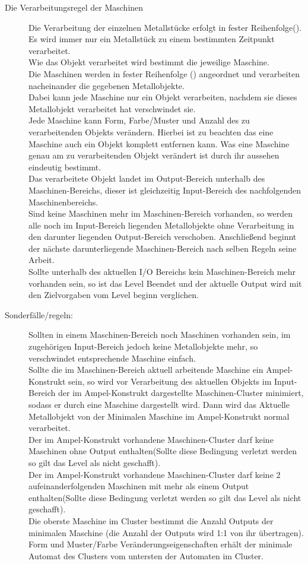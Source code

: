 \documentclass{scrartcl}
\begin{document}
\begin{description}
	\item[Die Verarbeitungsregel der Maschinen] Die Verarbeitung der einzelnen Metallstücke erfolgt in fester Reihenfolge().\\
	Es wird immer nur ein Metallstück zu einem bestimmten Zeitpunkt verarbeitet.\\
	Wie das Objekt verarbeitet wird bestimmt die jeweilige Maschine.\\
	Die Maschinen werden in fester Reihenfolge () angeordnet und verarbeiten nacheinander die gegebenen Metallobjekte.\\
	Dabei kann jede Maschine nur ein Objekt verarbeiten, nachdem sie dieses Metallobjekt verarbeitet hat verschwindet sie.\\
	Jede Maschine kann Form, Farbe/Muster und Anzahl des zu verarbeitenden Objekts verändern. Hierbei ist zu beachten das eine Maschine auch ein Objekt komplett entfernen kann. Was eine Maschine genau am zu verarbeitenden Objekt verändert ist durch ihr aussehen eindeutig bestimmt.\\
	Das verarbeitete Objekt landet im Output-Bereich unterhalb des Maschinen-Bereichs, dieser ist gleichzeitig Input-Bereich des nachfolgenden Maschinenbereichs.\\
	Sind keine Maschinen mehr im Maschinen-Bereich vorhanden, so werden alle noch im Input-Bereich liegenden Metallobjekte ohne Verarbeitung in den darunter liegenden Output-Bereich verschoben. Anschließend beginnt der nächste darunterliegende Maschinen-Bereich nach selben Regeln seine Arbeit.\\
	Sollte unterhalb des aktuellen I/O Bereichs kein Maschinen-Bereich mehr vorhanden sein, so ist das Level Beendet und der aktuelle Output wird mit den Zielvorgaben vom Level beginn verglichen.
	
	\item[Sonderfälle/regeln:] Sollten in einem Maschinen-Bereich noch Maschinen vorhanden sein, im zugehörigen Input-Bereich jedoch keine Metallobjekte mehr, so verschwindet entsprechende Maschine einfach.\\
	Sollte die im Maschinen-Bereich aktuell arbeitende Maschine ein Ampel-Konstrukt sein, so wird vor Verarbeitung des aktuellen Objekts im Input-Bereich der im Ampel-Konstrukt dargestellte Maschinen-Cluster minimiert, sodass er durch eine Maschine dargestellt wird. Dann wird das Aktuelle Metallobjekt von der Minimalen Maschine im Ampel-Konstrukt normal verarbeitet.\\
	Der im Ampel-Konstrukt vorhandene Maschinen-Cluster darf keine Maschinen ohne Output enthalten(Sollte diese Bedingung verletzt werden so gilt das Level als nicht geschafft).\\
	Der im Ampel-Konstrukt vorhandene Maschinen-Cluster darf keine 2 aufeinanderfolgenden Maschinen mit mehr als einem Output enthalten(Sollte diese Bedingung verletzt werden so gilt das Level als nicht geschafft).\\
	Die oberste Maschine im Cluster bestimmt die Anzahl Outputs der minimalen Maschine (die Anzahl der Outputs wird 1:1 von ihr übertragen). Form und Muster/Farbe Veränderungseigenschaften erhält der minimale Automat des Clusters vom untersten der Automaten im Cluster.
\end{description}
\end{document}
